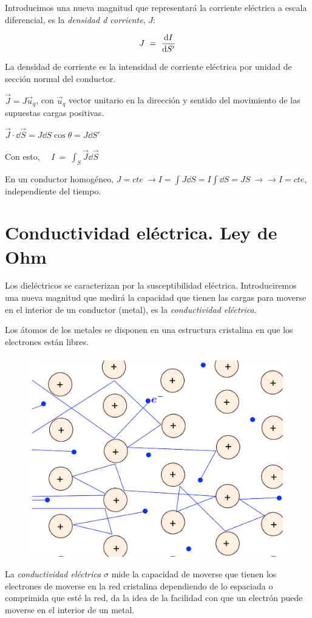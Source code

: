 Introducimos una nueva magnitud que representará la corriente eléctrica a escala diferencial, es la \emph{densidad d corriente}, $J$:

$$J\ =\ \displaystyle \dv{I}{S'}$$

La densidad de corriente es la intensidad de corriente eléctrica por unidad de sección normal del conductor.

$\vec J=J\vec u_q$, con $\vec u_q$ vector unitario en la dirección y sentido del movimiento de las supuestas cargas positivas. 

$\vec J \cdot \dd \vec S = J \dd S \cos \theta = J \dd S'$

Con esto, $\quad \displaystyle I\ = \ \int_S \vec J \dd \vec S$

En un conductor homogéneo, $J=cte \ \to I=\int J \dd S = I \int \dd S = JS \ \to \to I=cte$, independiente del tiempo.

\section{Conductividad eléctrica. Ley de Ohm}

\begin{multicols}{2}
Los dieléctricos se caracterizan por la susceptibilidad eléctrica. Introduciremos una nueva magnitud que medirá la capacidad que tienen las cargas para moverse en el interior de un conductor (metal), es la \emph{conductividad eléctrica}.

Los átomos de los metales se disponen en una estructura cristalina en que los electrones están libres.

\begin{figure}[H]
	\centering
	\includegraphics[width=.4\textwidth]{imagenes/imagenes25/T25IM01.png}
\end{figure}
\end{multicols}

La \emph{conductividad eléctrica} $\sigma$ mide la capacidad de moverse que tienen los electrones de moverse en la red cristalina dependiendo de lo espaciada o comprimida que esté la red, da la idea de la facilidad con que un electrón puede moverse en el interior de un metal.

